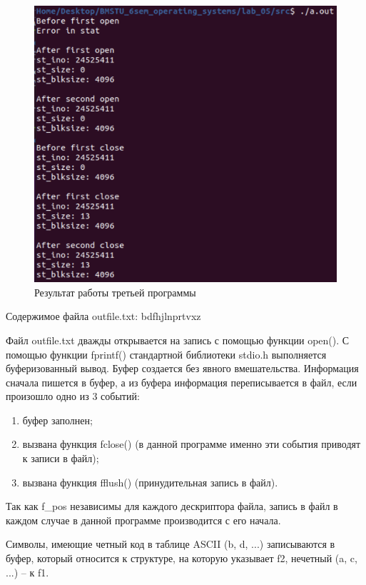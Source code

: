 \documentclass[12pt]{report}
\begin{document}
\begin{figure}[H]
	\centering
	\includegraphics[scale=0.8]{img/prog_03.png}
	\caption{Результат работы третьей программы}
	\label{fig:prog_03}
\end{figure}

Содержимое файла outfile.txt: bdfhjlnprtvxz

Файл outfile.txt дважды открывается на запись с помощью функции open(). 
С помощью функции fprintf() стандартной библиотеки stdio.h выполняется буферизованный вывод. Буфер создается без явного вмешательства. Информация сначала пишется в буфер, а из буфера информация переписывается в файл, если произошло одно из 3 событий:

\begin{enumerate}
	\item буфер заполнен;
	\item вызвана функция fclose() (в данной программе именно эти события приводят к записи в файл);
	\item вызвана функция fflush() (принудительная запись в файл).
\end{enumerate}

Так как f\_pos независимы для каждого дескриптора файла, запись в файл в каждом случае  в данной программе производится с его начала.

Символы, имеющие четный код в таблице ASCII  (b, d, ...) записываются в буфер, который относится к структуре, на которую указывает f2, нечетный (a, c, ...) -- к f1. 
\end{document}
